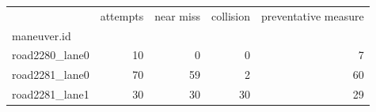 \begin{tabular}{lrrrr}
\toprule
 & attempts & near miss & collision & preventative measure \\
maneuver.id &  &  &  &  \\
\midrule
road2280_lane0 & 10 & 0 & 0 & 7 \\
road2281_lane0 & 70 & 59 & 2 & 60 \\
road2281_lane1 & 30 & 30 & 30 & 29 \\
\bottomrule
\end{tabular}
